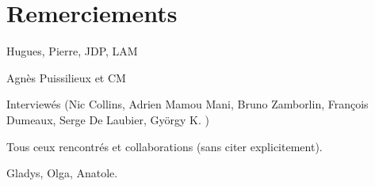 %
\chapter*{Remerciements}
\label{sec:acknowledgement}
\vspace*{-10mm}

Hugues, Pierre, JDP, LAM

Agnès Puissilieux et CM

Interviewés (Nic Collins, Adrien Mamou Mani, Bruno Zamborlin, François Dumeaux, Serge De Laubier, György K. )

Tous ceux rencontrés et collaborations (sans citer explicitement).

Gladys, Olga, Anatole.



\Blindtext[1][2]


